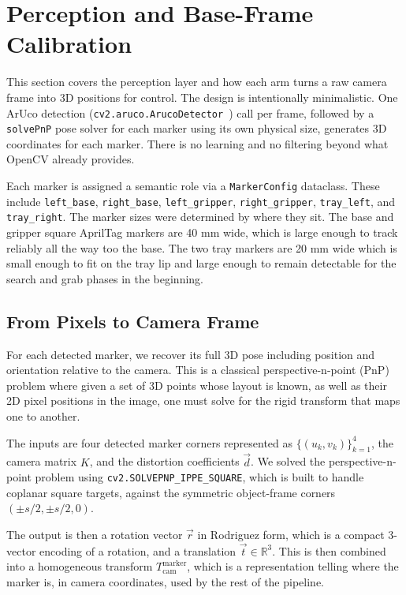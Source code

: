 \section{Perception and Base-Frame Calibration}
\label{sec:perception}

This section covers the perception layer and how each arm turns a raw camera frame into 3D positions for control. The design is intentionally minimalistic. One ArUco detection (\texttt{cv2.aruco.ArucoDetector}~\cite{garrido2014aruco}) call per frame, followed by a \texttt{solvePnP} pose solver for each marker using its own physical size, generates 3D coordinates for each marker. There is no learning and no filtering beyond what OpenCV already provides. 

Each marker is assigned a semantic role via a \texttt{MarkerConfig} dataclass. These include \texttt{left\_base}, \texttt{right\_base},
\texttt{left\_gripper}, \texttt{right\_gripper}, \texttt{tray\_left}, and
\texttt{tray\_right}. The marker sizes were determined by where they sit. The base and gripper square AprilTag markers are 40 mm wide, which is large enough to track reliably all the way too the base. The two tray markers are 20 mm wide which is small enough to fit on the tray lip and large enough to remain detectable for the search and grab phases in the beginning. 


\subsection{From Pixels to Camera Frame}
For each detected marker, we recover its full 3D pose including position and orientation relative to the camera. This is a classical perspective-n-point (PnP) problem where given a set of 3D points whose layout is known, as well as their 2D pixel positions in the image, one must solve for the rigid transform that maps one to another.

The inputs are four detected marker corners represented as $\{(u_k, v_k)\}_{k=1}^{4}$, the camera matrix $K$, and the distortion
coefficients $\vec{d}$. We solved the perspective-n-point problem using \texttt{cv2.SOLVEPNP\_IPPE\_SQUARE}, which is built to handle coplanar square targets, against the symmetric object-frame corners
$(\pm s/2, \pm s/2, 0)$.


The output is then a rotation vector $\vec{r}$ in Rodriguez form, which is a compact 3-vector encoding of a rotation, and a translation $\vec{t}\in\mathbb{R}^3$. This is then combined into a homogeneous transform $T_{\text{cam}}^{\text{marker}}$, which is a representation telling where the marker is, in camera coordinates, used by the rest of the pipeline.

